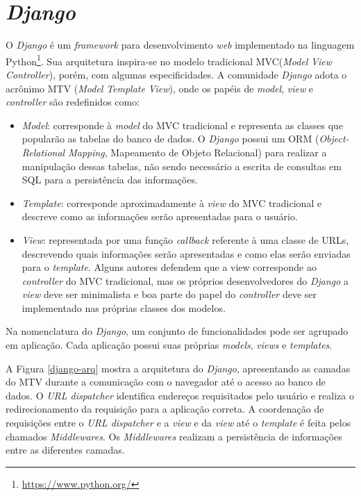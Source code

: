 \section{\textit{Django}}
O \textit{Django} \cite{django_project} é um \textit{framework} para desenvolvimento \textit{web} implementado na linguagem Python\footnote{\url{https://www.python.org/}}. Sua arquitetura inspira-se no modelo tradicional MVC(\textit{Model} \textit{View} \textit{Controller}), porém, com algumas especificidades. A comunidade \textit{Django} adota o acrônimo MTV (\textit{Model} \textit{Template} \textit{View}), onde os papéis de \textit{model}, \textit{view} e \textit{controller} são redefinidos como:
\begin{itemize}
    \item \textit{Model}: corresponde à \textit{model} do MVC tradicional e representa as classes que popularão as tabelas do banco de dados. O \textit{Django} possui um ORM (\textit{Object-Relational Mapping}, Mapeamento de Objeto Relacional) para realizar a manipulação dessas tabelas, não sendo necessário a escrita de consultas em SQL para a persistência das informações.
    \item \textit{Template}: corresponde aproximadamente à \textit{view} do MVC tradicional e descreve como as informações serão apresentadas para o usuário.
    \item \textit{View}: representada por uma função \textit{callback} referente à uma classe de URLs, descrevendo quais informações serão apresentadas e como elas serão enviadas para o \textit{template}. Alguns autores defendem que a view corresponde ao \textit{controller} do MVC tradicional, mas os próprios desenvolvedores do \textit{Django} a \textit{view} deve ser minimalista e boa parte do papel do \textit{controller} deve ser implementado nas próprias classes dos modelos.
\end{itemize}

Na nomenclatura do \textit{Django}, um conjunto de funcionalidades pode ser agrupado em aplicação. Cada aplicação possui suas próprias \textit{models}, \textit{views} e \textit{templates}.

A Figura \ref{django-arq} mostra a arquitetura do \textit{Django}, apresentando as camadas do MTV durante a comunicação com o navegador até o acesso ao banco de dados. O \textit{URL dispatcher} identifica endereços requisitados pelo usuário e realiza o redirecionamento da requisição para a aplicação correta. A coordenação de requisições entre o \textit{URL dispatcher} e a \textit{view} e da \textit{view} até o \textit{template} é feita pelos chamados \textit{Middlewares}. Os \textit{Middlewares} realizam a persistência de informações entre as diferentes camadas.

